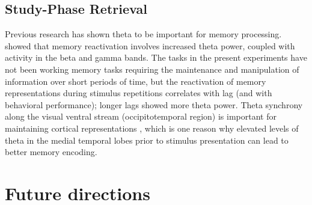 \subsection{Study-Phase Retrieval}


Previous research has shown theta to be important for memory processing.
 showed that memory reactivation involves increased theta power, coupled with activity in the beta and gamma bands.
The tasks in the present experiments have not been working memory tasks requiring the maintenance and manipulation of information over short periods of time, but the reactivation of memory representations during stimulus repetitions correlates with lag (and with behavioral performance); longer lags showed more theta power.
Theta synchrony along the visual ventral stream (occipitotemporal region) is important for maintaining cortical representations \cite{DuzeEtal2010}, which is one reason why elevated levels of theta in the medial temporal lobes prior to stimulus presentation can lead to better memory encoding.








\section{Future directions}


